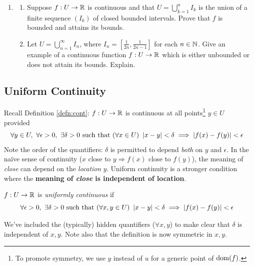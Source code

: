 \begin{exercises}
\begin{enumerate}
		
		\item\begin{enumerate}
		  \item Suppose $f:U\to\mathbb{R}$ is continuous and that $U=\bigcup\limits_{k=1}^nI_k$ is the union of a finite sequence $(I_k)$ of closed bounded intervals. Prove that $f$ is bounded and attains its bounds.
		  \item Let $U=\bigcup\limits_{n=1}^\infty I_n$, where $I_n=[\frac 1{2n},\frac 1{2n-1}]$ for each $n\in\mathbb{N}$. Give an example of a continuous function $f:U\to\mathbb{R}$ which is either unbounded or does not attain its bounds. Explain.
		\end{enumerate}
	\end{enumerate}
\end{exercises}


\clearpage


\subsection{Uniform Continuity}\label{sec:unifcont}

Recall Definition \ref{defn:cont}: $f:U\to\mathbb{R}$ is continuous at all points\footnote{%
	To promote symmetry, we use $y$ instead of $u$ for a generic point of $\operatorname{dom}(f)$.%
}
$y\in U$ provided
\[
	\forall y\in U,\ \forall\epsilon>0,\ \exists \delta>0\text{ such that }
	(\forall x\in U)\ \nm{x-y}<\delta
	\implies \nm{f(x)-f(y)}<\epsilon
\]
Note the order of the quantifiers: $\delta$ is permitted to depend \emph{both} on $y$ and $\epsilon$. In the naïve sense of continuity ($x$ close to $y\Longrightarrow f(x)$ close to $f(y)$), the meaning of \emph{close} can depend on the \emph{location} $y$. Uniform continuity is a stronger condition where the \textbf{meaning of \emph{close} is independent of location}.

\begin{defn}{}{}
	$f:U\to\mathbb{R}$ is \emph{uniformly continuous} if
	\[
		\forall\epsilon>0,\ \exists \delta>0\text{ such that }
		(\forall x,y\in U)\ \nm{x-y}<\delta
		\implies \nm{f(x)-f(y)}<\epsilon
	\]
\end{defn}
We've included the (typically) hidden quantifiers ($\forall x,y$) to make clear that $\delta$ is independent of $x,y$. Note also that the definition is now symmetric in $x,y$.


